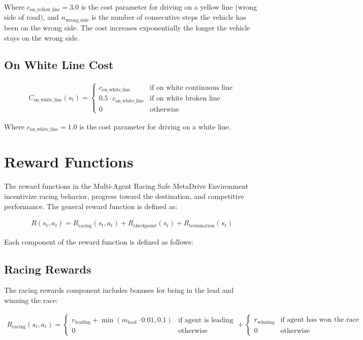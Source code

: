 \documentclass{article}
\begin{document}
Where $c_{\text{on\_yellow\_line}} = 3.0$ is the cost parameter for driving on a yellow line (wrong side of road), and $n_{\text{wrong\_side}}$ is the number of consecutive steps the vehicle has been on the wrong side. The cost increases exponentially the longer the vehicle stays on the wrong side.

\subsection{On White Line Cost}

\begin{align}
C_{\text{on\_white\_line}}(s_t) = 
\begin{cases}
c_{\text{on\_white\_line}} & \text{if on white continuous line} \\
0.5 \cdot c_{\text{on\_white\_line}} & \text{if on white broken line} \\
0 & \text{otherwise}
\end{cases}
\end{align}

Where $c_{\text{on\_white\_line}} = 1.0$ is the cost parameter for driving on a white line.

\section{Reward Functions}

The reward functions in the Multi-Agent Racing Safe MetaDrive Environment incentivize racing behavior, progress toward the destination, and competitive performance. The general reward function is defined as:

\begin{align}
R(s_t, a_t) = R_{\text{racing}}(s_t, a_t) + R_{\text{checkpoint}}(s_t) + R_{\text{termination}}(s_t)
\end{align}

Each component of the reward function is defined as follows:

\subsection{Racing Rewards}

The racing rewards component includes bonuses for being in the lead and winning the race:

\begin{align}
R_{\text{racing}}(s_t, a_t) = 
\begin{cases}
r_{\text{leading}} + \min(m_{\text{lead}} \cdot 0.01, 0.1) & \text{if agent is leading} \\
0 & \text{otherwise}
\end{cases}
+ 
\begin{cases}
r_{\text{winning}} & \text{if agent has won the race} \\
0 & \text{otherwise}
\end{cases}
\end{align}
\end{document}
